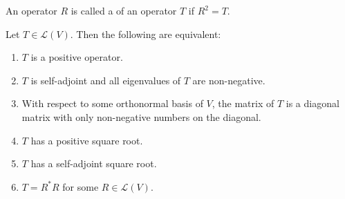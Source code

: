 \begin{definition}
An operator $R$ is called a  of an operator $T$ if $R^2=T$.
\end{definition}

\begin{lemma}\label{lemma:positive-operator-characterisation}
Let $T\in\mathcal{L}(V)$. Then the following are equivalent:
\begin{enumerate}[label=(\roman*)]
\item $T$ is a positive operator.
\item $T$ is self-adjoint and all eigenvalues of $T$ are non-negative.
\item With respect to some orthonormal basis of $V$, the matrix of $T$ is a diagonal matrix with only non-negative numbers on the diagonal.
\item $T$ has a positive square root.
\item $T$ has a self-adjoint square root.
\item $T=R^*R$ for some $R\in\mathcal{L}(V)$.
\end{enumerate}
\end{lemma}


